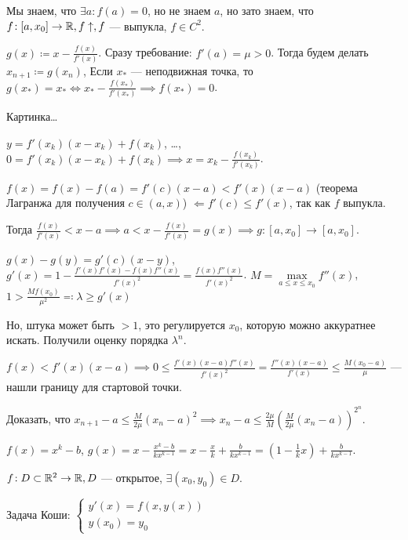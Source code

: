 \begin{example}
    Мы знаем, что $\exists a\!: f(a) = 0$, но не знаем  $a$, но зато знаем, что  $f\!: [a, x_0] \to \mathbb{R}, f\uparrow, f$ --- выпукла, $f \in C^2$.

    $g(x) \coloneqq x - \frac{f(x)}{f'(x)}$. Сразу требование: $f'(a) = \mu > 0$. Тогда будем делать  $x_{n+1} \coloneqq g(x_n)$, Если $x_*$ --- неподвижная точка, то  $g(x_*) = x_* \iff x_* - \frac{f(x_*)}{f'(x_*)} \implies f(x_*) = 0$.

    Картинка\dots

    $y = f'(x_k)(x-x_k) + f(x_k)$, \dots, $0 = f'(x_k)(x-x_k) + f(x_k) \implies x = x_k - \frac{f(x_k)}{f'(x_k)}$.

    $f(x) = f(x) - f(a) = f'(c)(x-a) < f'(x)(x-a)$ (теорема Лагранжа для получения $c \in (a, x)$) $\Leftarrow f'(c) \le f'(x)$, так как $f$ выпукла.

    Тогда  $\frac{f(x)}{f'(x)} < x-a \implies a < x - \frac{f(x)}{f'(x)} = g(x) \implies g\!: [a, x_0] \to [a, x_0]$.

    $g(x) - g(y) = g'(c)(x-y)$,  $g'(x) = 1 - \frac{f'(x) f'(x) - f(x)f''(x)}{f'(x)^2} = \frac{f(x)f''(x)}{f'(x)^2}$. $M = \max\limits_{a \le x \le x_0} f''(x)$, $1 > \frac{Mf(x_0)}{\mu^2} \eqqcolon \lambda \ge g'(x)$

    Но, штука может быть $>1$, это регулируется  $x_0$, которую можно аккуратнее искать. Получили оценку порядка  $\lambda^n$.

     $f(x) < f'(x)(x-a) \implies 0 \le \frac{f'(x)(x-a)f''(x)}{f'(x)^2} = \frac{f''(x)(x-a)}{f'(x)} \le \frac{M(x_0 - a)}{\mu}$ --- нашли границу для стартовой точки.

     \begin{exerc}
         Доказать, что $x_{n+1} - a \le \frac{M}{2\mu}(x_n-a)^2 \implies x_n -a \le \frac{2\mu}{M}(\frac{M}{2\mu}(x_n-a))^{2^n}$.
     \end{exerc}
\end{example}
\begin{remark}
    $f(x) = x^k - b$,  $g(x) = x - \frac{x^k - b}{kx^{k-1}} = x - \frac{x}{k} + \frac{b}{kx^{k-1}} = (1-\frac{1}{k}x)+\frac{b}{kx^{k-1}}$.
\end{remark}
\begin{definition}
    $f\!: D \subset \mathbb{R}^2 \to \mathbb{R}, D$ --- открытое, $\exists (x_0, y_0) \in D$.

     Задача Коши: $
\begin{cases}
    y'(x) = f(x, y(x))\\
    y(x_0) = y_0
\end{cases}
     $
\end{definition}
